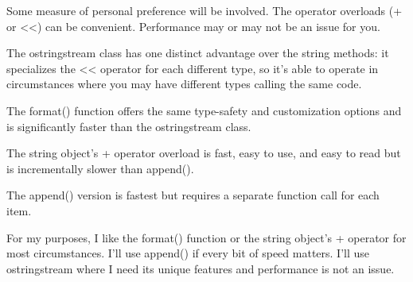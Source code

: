 Some measure of personal preference will be involved. The operator overloads (+ or <{}<) can be convenient. Performance may or may not be an issue for you.

The ostringstream class has one distinct advantage over the string methods: it specializes the << operator for each different type, so it's able to operate in circumstances where you may have different types calling the same code.

The format() function offers the same type-safety and customization options and is significantly faster than the ostringstream class.

The string object's + operator overload is fast, easy to use, and easy to read but is incrementally slower than append().

The append() version is fastest but requires a separate function call for each item.

For my purposes, I like the format() function or the string object's + operator for most circumstances. I'll use append() if every bit of speed matters. I'll use ostringstream where I need its unique features and performance is not an issue.